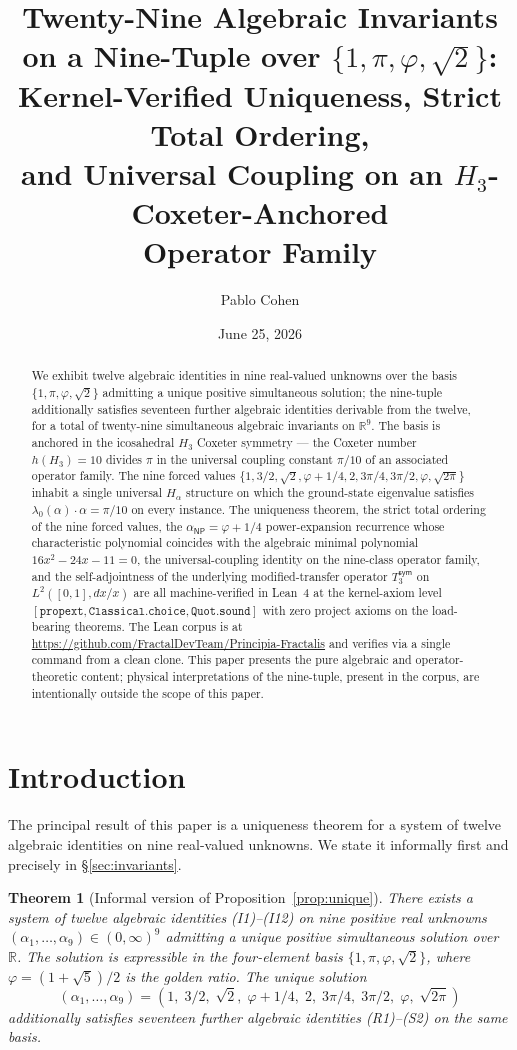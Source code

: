 \documentclass[11pt,a4paper]{amsart}
\title{Twenty-Nine Algebraic Invariants on a Nine-Tuple over $\{1, \pi, \varphi, \sqrt{2}\}$:\\
Kernel-Verified Uniqueness, Strict Total Ordering,\\
and Universal Coupling on an $H_3$-Coxeter-Anchored\\
Operator Family}
\author{Pablo Cohen}
\date{June 25, 2026}
\theoremstyle{plain}
\newtheorem{theorem}{Theorem}[section]
\theoremstyle{definition}
\begin{document}
\maketitle

\begin{abstract}
We exhibit twelve algebraic identities in nine real-valued unknowns over the basis $\{1, \pi, \varphi, \sqrt{2}\}$ admitting a unique positive simultaneous solution; the nine-tuple additionally satisfies seventeen further algebraic identities derivable from the twelve, for a total of twenty-nine simultaneous algebraic invariants on $\mathbb{R}^9$. The basis is anchored in the icosahedral $H_3$ Coxeter symmetry --- the Coxeter number $h(H_3) = 10$ divides $\pi$ in the universal coupling constant $\pi/10$ of an associated operator family. The nine forced values $\{1, 3/2, \sqrt{2}, \varphi + 1/4, 2, 3\pi/4, 3\pi/2, \varphi, \sqrt{2\pi}\}$ inhabit a single universal $H_\alpha$ structure on which the ground-state eigenvalue satisfies $\lambda_0(\alpha) \cdot \alpha = \pi/10$ on every instance. The uniqueness theorem, the strict total ordering of the nine forced values, the $\alpha_{\textsf{NP}} = \varphi + 1/4$ power-expansion recurrence whose characteristic polynomial coincides with the algebraic minimal polynomial $16x^2 - 24x - 11 = 0$, the universal-coupling identity on the nine-class operator family, and the self-adjointness of the underlying modified-transfer operator $T_3^{\textsf{sym}}$ on $L^2([0,1], dx/x)$ are all machine-verified in Lean~4 at the kernel-axiom level $[\texttt{propext}, \texttt{Classical.choice}, \texttt{Quot.sound}]$ with zero project axioms on the load-bearing theorems. The Lean corpus is at \url{https://github.com/FractalDevTeam/Principia-Fractalis} and verifies via a single command from a clean clone. This paper presents the pure algebraic and operator-theoretic content; physical interpretations of the nine-tuple, present in the corpus, are intentionally outside the scope of this paper.
\end{abstract}

\section{Introduction}

The principal result of this paper is a uniqueness theorem for a system of twelve algebraic identities on nine real-valued unknowns. We state it informally first and precisely in \S\ref{sec:invariants}.

\begin{theorem}[Informal version of Proposition~\ref{prop:unique}]
There exists a system of twelve algebraic identities (I1)--(I12) on nine positive real unknowns $(\alpha_1, \ldots, \alpha_9) \in (0, \infty)^9$ admitting a unique positive simultaneous solution over $\mathbb{R}$. The solution is expressible in the four-element basis $\{1, \pi, \varphi, \sqrt{2}\}$, where $\varphi = (1 + \sqrt{5})/2$ is the golden ratio. The unique solution
\[
(\alpha_1, \ldots, \alpha_9) = (1,\;3/2,\;\sqrt{2},\;\varphi + 1/4,\;2,\;3\pi/4,\;3\pi/2,\;\varphi,\;\sqrt{2\pi})
\]
additionally satisfies seventeen further algebraic identities (R1)--(S2) on the same basis.
\end{theorem}
\end{document}
